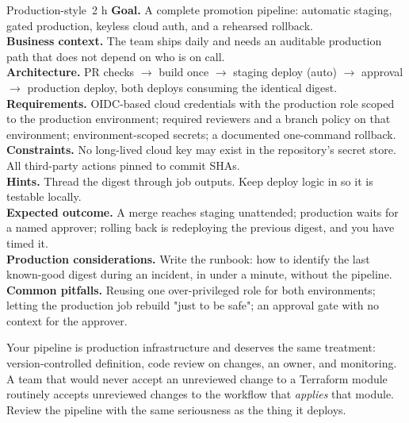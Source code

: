 \begin{minilab}{Production-style}{~2 h}
\textbf{Goal.} A complete promotion pipeline: automatic staging, gated production, keyless cloud auth, and a rehearsed rollback.\\
\textbf{Business context.} The team ships daily and needs an auditable production path that does not depend on who is on call.\\
\textbf{Architecture.} PR checks $\rightarrow$ build once $\rightarrow$ staging deploy (auto) $\rightarrow$ approval $\rightarrow$ production deploy, both deploys consuming the identical digest.\\
\textbf{Requirements.} OIDC-based cloud credentials with the production role scoped to the production environment; required reviewers and a branch policy on that environment; environment-scoped secrets; a documented one-command rollback.\\
\textbf{Constraints.} No long-lived cloud key may exist in the repository's secret store. All third-party actions pinned to commit SHAs.\\
\textbf{Hints.} Thread the digest through job outputs. Keep deploy logic in  so it is testable locally.\\
\textbf{Expected outcome.} A merge reaches staging unattended; production waits for a named approver; rolling back is redeploying the previous digest, and you have timed it.\\
\textbf{Production considerations.} Write the runbook: how to identify the last known-good digest during an incident, in under a minute, without the pipeline.\\
\textbf{Common pitfalls.} Reusing one over-privileged role for both environments; letting the production job rebuild "just to be safe"; an approval gate with no context for the approver.
\end{minilab}


\begin{infranote}
Your pipeline is production infrastructure and deserves the same treatment: version-controlled definition, code review on changes, an owner, and monitoring. A team that would never accept an unreviewed change to a Terraform module routinely accepts unreviewed changes to the workflow that \emph{applies} that module. Review the pipeline with the same seriousness as the thing it deploys.
\end{infranote}

